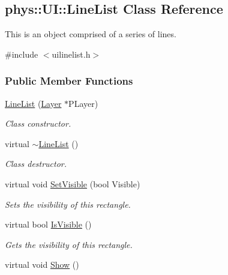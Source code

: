 \hypertarget{classphys_1_1UI_1_1LineList}{
\subsection{phys::UI::LineList Class Reference}
\label{classphys_1_1UI_1_1LineList}
}


This is an object comprised of a series of lines.  




{\ttfamily \#include $<$uilinelist.h$>$}

\subsubsection*{Public Member Functions}
\begin{DoxyCompactItemize}
\item 
\hyperlink{classphys_1_1UI_1_1LineList_a4eb08071252e1bddf1237d6a4018a86c}{LineList} (\hyperlink{classphys_1_1UI_1_1Layer}{Layer} $\ast$PLayer)
\begin{DoxyCompactList}\small\item\em Class constructor. \item\end{DoxyCompactList}\item 
\hypertarget{classphys_1_1UI_1_1LineList_ae962ca10492137ed85f7b66a79d4887e}{
virtual \hyperlink{classphys_1_1UI_1_1LineList_ae962ca10492137ed85f7b66a79d4887e}{$\sim$LineList} ()}
\label{classphys_1_1UI_1_1LineList_ae962ca10492137ed85f7b66a79d4887e}

\begin{DoxyCompactList}\small\item\em Class destructor. \item\end{DoxyCompactList}\item 
virtual void \hyperlink{classphys_1_1UI_1_1LineList_acecf11c133825233afd73d55ba9e4c1d}{SetVisible} (bool Visible)
\begin{DoxyCompactList}\small\item\em Sets the visibility of this rectangle. \item\end{DoxyCompactList}\item 
virtual bool \hyperlink{classphys_1_1UI_1_1LineList_af8c50f2e60b5a087cc9f3a280e10bd72}{IsVisible} ()
\begin{DoxyCompactList}\small\item\em Gets the visibility of this rectangle. \item\end{DoxyCompactList}\item 
\hypertarget{classphys_1_1UI_1_1LineList_ae725a770a9b938d01f1a161be050fcc5}{
virtual void \hyperlink{classphys_1_1UI_1_1LineList_ae725a770a9b938d01f1a161be050fcc5}{Show} ()}
\label{classphys_1_1UI_1_1LineList_ae725a770a9b938d01f1a161be050fcc5}


\end{DoxyCompactItemize}
